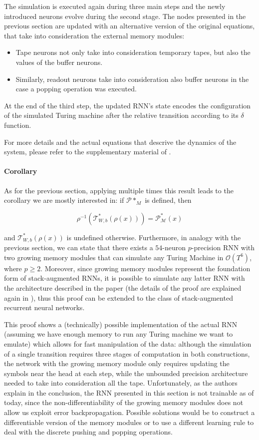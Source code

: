 \documentclass{article}
\begin{document}
The simulation is executed again during three main steps and the newly introduced neurons evolve during the second stage. The nodes presented in the previous section are updated with an alternative version of the original equations, that take into consideration the external memory modules:

\begin{itemize}
    \item Tape neurons not only take into consideration temporary tapes, but also the values of the buffer neurons.
    \item Similarly, readout neurons take into consideration also buffer neurons in the case a popping operation was executed.
\end{itemize}

At the end of the third step, the updated RNN's state encodes the configuration of the simulated Turing machine after the relative transition according to its $\delta$ function.

For more details and the actual equations that descrive the dynamics of the system, please refer to the supplementary material of \cite{CHU21}.

\paragraph{Corollary}
As for the previous section, applying multiple times this result leads to the corollary we are mostly interested in: if $\mathcal{P}*_{M}$ is defined, then

$$\rho^{-1}(\mathcal{T}^*_{W,b}(\rho(x))) = \mathcal{P}^*_{\mathcal{M}}(x)$$

and $\mathcal{T}^*_{W,b}(\rho(x))$ is undefined otherwise.
Furthermore, in analogy with the previous section, we can state that there exists a $54$-neuron $p$-precision RNN with two growing memory modules that can simulate any Turing Machine in $\mathcal{O}(T^6)$, where $p \geq 2$. Moreover, since growing memory modules represent the foundation form of stack-augmented RNNs, it is possible to simulate any latter RNN with the architecture described in the paper (the details of the proof are explained again in \cite{CHU21}), thus this proof can be extended to the class of stack-augmented recurrent neural networks.

This proof shows a (technically) possible implementation of the actual RNN (assuming we have enough memory to run any Turing machine we want to emulate) which allows for fast manipulation of the data: although the simulation of a single transition requires three stages of computation in both constructions, the network with the growing memory module only requires updating the symbols near the head at each step, while the unbounded precision architecture needed to take into consideration all the tape.
Unfortunately, as the authors explain in the conclusion, the RNN presented in this section is not trainable as of today, since the non-differentiability of the growing memory modules does not allow us exploit error backpropagation. Possible solutions would be to construct a differentiable version of the memory modules or to use a different learning rule to deal with the discrete pushing and popping operations.
\end{document}
